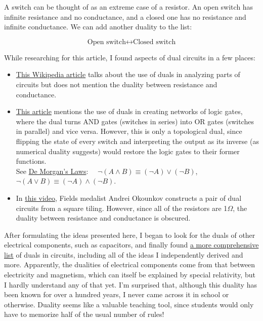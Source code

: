\documentclass{article}
\begin{document}
A switch can be thought of as an extreme case of a resistor.
An open switch has infinite resistance and no conductance,
and a closed one has no resistance and infinite conductance.
We can add another duality to the list:

\[\text{Open switch} \leftrightarrow \text{Closed switch}\]



While researching for this article, I found aspects of dual circuits in a few places:

\begin{itemize}
\item
  \href{https://en.wikipedia.org/wiki/Topology\_(electrical\_circuits)#Duality}{This Wikipedia article}
  talks about the use of duals in analyzing parts of circuits
  but does not mention the duality between resistance and conductance.
\item
  \href{https://en.wikipedia.org/wiki/Dual\_graph#Applications}{This article}
  mentions the use of duals in creating networks of logic gates,
  where the dual turns AND gates (switches in series)
  into OR gates (switches in parallel) and vice versa.
  However, this is only a topological dual,
  since flipping the state of every switch and interpreting the output as its inverse
  (as numerical duality suggests)
  would restore the logic gates to their former functions.\\
  See \href{https://en.wikipedia.org/wiki/De\_Morgan\'s\_laws}{De Morgan's Laws}: \ \ 
  $\lnot (A \land B) \equiv (\lnot A) \lor (\lnot B)$, $\lnot (A \lor B) \equiv (\lnot A) \land (\lnot B)$.
\item
  In \href{https://www.numberphile.com/videos/squares-and-tilings}{this video},
  Fields medalist Andrei Okounkov constructs a pair of dual circuits from a square tiling.
  However, since all of the resistors are 1$\Omega$,
  the duality between resistance and conductance is obscured.
  
\end{itemize}

After formulating the ideas presented here,
I began to look for the duals of other electrical components,
such as capacitors, and finally found
\href{https://en.wikipedia.org/wiki/Duality\_(electrical\_circuits)}{a more comprehensive list}
of duals in circuits, including all of the ideas I independently derived and more.
Apparently, the dualities of electrical components come from that between electricity and magnetism,
which can itself be explained by special relativity,
but I hardly understand any of that yet.
I'm surprised that, although this duality has been known for over a hundred years,
I never came across it in school or otherwise.
Duality seems like a valuable teaching tool,
since students would only have to memorize half of the usual number of rules!
     
\end{document}

